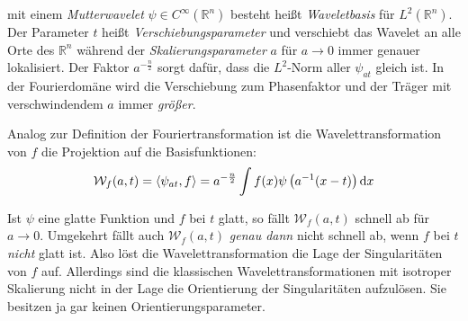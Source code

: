  mit einem \textit{Mutterwavelet} $\psi \in C^\infty (\mathbb{R}^n)$ besteht heißt \textit{Waveletbasis} für $L^2(\mathbb{R}^n)$. Der Parameter $t$ heißt \textit{Verschiebungsparameter} und verschiebt das Wavelet an alle Orte des $\mathbb{R}^n$ während der \textit{Skalierungsparameter} $a$ für $a \to 0$ immer genauer lokalisiert. Der Faktor $a^{-\frac{n}{2}}$ sorgt dafür, dass die $L^2$-Norm aller $\psi_{at}$ gleich ist. In der Fourierdomäne wird die Verschiebung zum Phasenfaktor und der Träger mit verschwindendem $a$ immer \emph{größer}.



Analog zur Definition der Fouriertransformation ist die Wavelettransformation von $f$ die Projektion auf die Basisfunktionen:
\begin{equation}
    \mathcal{W}_f (a,t) = \left\langle\psi_{at},f\right\rangle
    = a^{-\frac{n}{2}} \int f(x) \psi \left(a^{-1}(x-t)\right) \mathop{}\!\mathrm{d} x
\end{equation}

Ist $\psi$ eine glatte Funktion und $f$ bei $t$ glatt, so fällt $\mathcal{W}_f (a,t)$ schnell ab für $a \to 0$.
Umgekehrt fällt auch $\mathcal{W}_f(a,t)$ \emph{genau dann} nicht schnell ab, wenn $f$ bei $t$ \emph{nicht} glatt ist. Also löst die Wavelettransformation die Lage der Singularitäten von $f$ auf. Allerdings sind die klassischen  Wavelettransformationen mit isotroper Skalierung nicht in der Lage die  Orientierung der Singularitäten aufzulösen. Sie besitzen ja gar keinen Orientierungsparameter.

